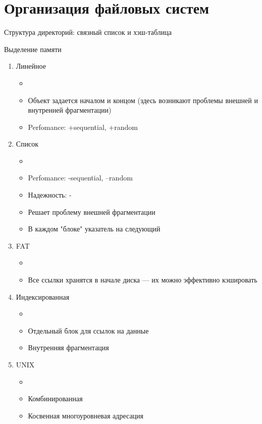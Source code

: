 \documentclass[../../lectures.tex]{subfiles}
\begin{document}
\section{Организация файловых систем}
Структура директорий: связный список и хэш-таблица

Выделение памяти
\begin{enumerate}
    \item Линейное
        \begin{itemize}
            \item {}
            \item Объект задается началом и концом (здесь возникают проблемы внешней и внутренней фрагментации)
            \item Perfomance: +sequential, +random
        \end{itemize}
    \item Список
        \begin{itemize}
            \item {}
            \item Perfomance: -sequential, --random
            \item Надежность: -
            \item Решает проблему внешней фрагментации
            \item В каждом "блоке" указатель на следующий
        \end{itemize}
    \item FAT
        \begin{itemize}
            \item {}
            \item Все ссылки хранятся в начале диска --- их можно эффективно кэшировать
        \end{itemize}
    \item Индексированная
        \begin{itemize}
            \item {}
            \item Отдельный блок для ссылок на данные
            \item Внутренняя фрагментация
        \end{itemize}
    \item UNIX
        \begin{itemize}
            \item {}
            \item Комбинированная
            \item Косвенная многоуровневая адресация
        \end{itemize}
\end{enumerate}
\end{document}
